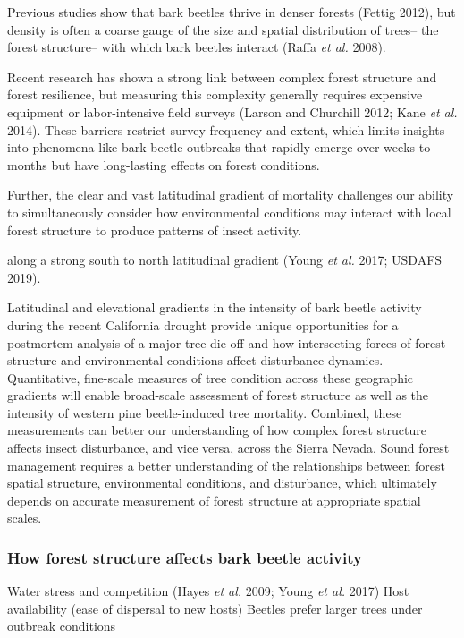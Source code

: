 \documentclass[]{article}
\begin{document}
Previous studies show that bark beetles thrive in denser forests (Fettig
2012), but density is often a coarse gauge of the size and spatial
distribution of trees-- the forest structure-- with which bark beetles
interact (Raffa \emph{et al.} 2008).

Recent research has shown a strong link between complex forest structure
and forest resilience, but measuring this complexity generally requires
expensive equipment or labor-intensive field surveys (Larson and
Churchill 2012; Kane \emph{et al.} 2014). These barriers restrict survey
frequency and extent, which limits insights into phenomena like bark
beetle outbreaks that rapidly emerge over weeks to months but have
long-lasting effects on forest conditions.

Further, the clear and vast latitudinal gradient of mortality challenges
our ability to simultaneously consider how environmental conditions may
interact with local forest structure to produce patterns of insect
activity.

along a strong south to north latitudinal gradient (Young \emph{et al.}
2017; USDAFS 2019).

Latitudinal and elevational gradients in the intensity of bark beetle
activity during the recent California drought provide unique
opportunities for a postmortem analysis of a major tree die off and how
intersecting forces of forest structure and environmental conditions
affect disturbance dynamics. Quantitative, fine-scale measures of tree
condition across these geographic gradients will enable broad-scale
assessment of forest structure as well as the intensity of western pine
beetle-induced tree mortality. Combined, these measurements can better
our understanding of how complex forest structure affects insect
disturbance, and vice versa, across the Sierra Nevada. Sound forest
management requires a better understanding of the relationships between
forest spatial structure, environmental conditions, and disturbance,
which ultimately depends on accurate measurement of forest structure at
appropriate spatial scales.

\subsubsection{How forest structure affects bark beetle
activity}\label{how-forest-structure-affects-bark-beetle-activity}

Water stress and competition (Hayes \emph{et al.} 2009; Young \emph{et
al.} 2017) Host availability (ease of dispersal to new hosts) Beetles
prefer larger trees under outbreak conditions
\end{document}
